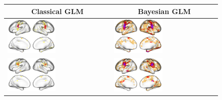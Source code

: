 \documentclass{article}
\begin{document}
	\begin{figure}
		\begin{tabularx}{\textwidth}{|X|X|}
			\multicolumn{1}{c}{\textbf{Classical GLM}} & \multicolumn{1}{c}{\textbf{Bayesian GLM}}  \\ \hline
			\includegraphics[width=0.48\textwidth]{plots/603_subject_103818_tongue_task_activations_classical.png} &
			\includegraphics[width=0.48\textwidth]{plots/603_subject_103818_tongue_task_activations.png} \\ \hline
			\includegraphics[width=0.48\textwidth]{plots/603_subject_105923_tongue_task_activations_classical.png} &
			\includegraphics[width=0.48\textwidth]{plots/603_subject_105923_tongue_task_activations.png} \\ \hline

\end{tabularx}
\end{figure}
\end{document}
